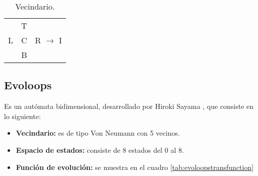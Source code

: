 \begin{table}[H]
	\begin{center}
		\begin{tabular}{ c c c}
			&T&\\
			L&C&R $\rightarrow$ I\\
			&B&\\
		\end{tabular}
	\end{center}
	\caption{\label{tab:bylneigh} Vecindario.}
\end{table}

\subsection{Evoloops}
Es un autómata bidimensional, desarrollado por Hiroki Sayama \citep{Sayama1998ConstructingES}, que consiste en lo siguiente:
\begin{itemize}
	\item \textbf{Vecindario:} es de tipo Von Neumann con 5 vecinos.
	\item \textbf{Espacio de estados:} consiste de 8 estados del 0 al 8.
	\item \textbf{Función de evolución:} se muestra en el cuadro \ref{tab:evoloopstransfunction}
\end{itemize}

